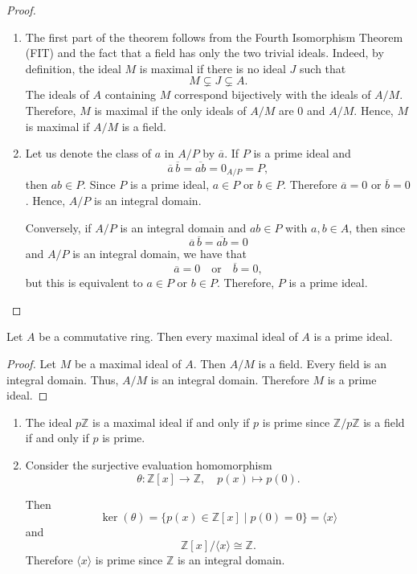 \documentclass[11pt,a4paper]{article}
\begin{document}
\begin{proof}
\begin{enumerate}[label=(\roman*)]
    \item The first part of the theorem follows from the Fourth Isomorphism Theorem (FIT) and the fact that a field has only the two trivial ideals. Indeed, by definition, the ideal $M$ is maximal if there is no ideal $J$ such that
    \[
    M \subsetneq J \subsetneq A.
    \]
    The ideals of $A$ containing $M$ correspond bijectively with the ideals of $A/M$. Therefore, $M$ is maximal if the only ideals of $A/M$ are $0$ and $A/M$. Hence,  $M$ is maximal if $A/M$ is a field.

    \item Let us denote the class of $a$ in $A/P$ by $\overline{a}$.  If $P$ is a prime ideal and 
    \[
    \overline{a} \, \overline{b} = \overline{a b} = 0_{A/P}= P,
    \]
    then $ab \in P$. Since $P$ is a prime ideal,   \(a \in P \) or \(b \in P\).
    Therefore \(\overline{a} = 0\)  or \(\overline{b} = 0\).
    Hence, $A/P$ is an integral domain.

    Conversely, if $A/P$ is an integral domain and $ab \in P$ with $a, b \in A$, then since
    \[
    \overline{a} \, \overline{b} = \overline{a b} = 0
    \]
    and $A/P$ is an integral domain, we have that
    \[
    \overline{a} = 0 \quad \text{or} \quad \overline{b} = 0,
    \]
    but this is equivalent to  \(a \in P \) or \(b \in P\). 
    Therefore, $P$ is a prime ideal.
\end{enumerate}
\end{proof}

\begin{prop} 
    Let  $A$ be  a commutative ring.
    Then  every maximal ideal of $A$ is a prime ideal.
\end{prop}

\begin{proof}
Let   $M$ be a maximal ideal of $A$. Then  $A/M$ is a field. Every field is an integral domain. Thus, $A/M$ is an integral domain. Therefore  $M$ is a prime ideal.
\end{proof}

\begin{exa}
\begin{enumerate}[label=(\roman*)]
\item  The ideal $p\mathbb{Z}$ is a maximal ideal if and only if $p$ is prime since $\mathbb{Z}/p\mathbb{Z}$ is a field if and only if $p$ is prime.

\item Consider the surjective evaluation homomorphism 
    \[
    \theta : \mathbb{Z}[x] \to \mathbb{Z}, \quad p(x) \mapsto   p(0).
    \]
    
    Then
    \[
    \ker(\theta) = \{p(x) \in \mathbb{Z}[x] \mid p(0) = 0\} = \langle x \rangle
    \]
    and
    \[
    \mathbb{Z}[x] / \langle x \rangle \cong \mathbb{Z}.
    \]
    Therefore   $\langle x \rangle$ is   prime   since $\mathbb{Z}$ is an integral domain.
\end{enumerate}
\end{exa}
    
\end{document}
